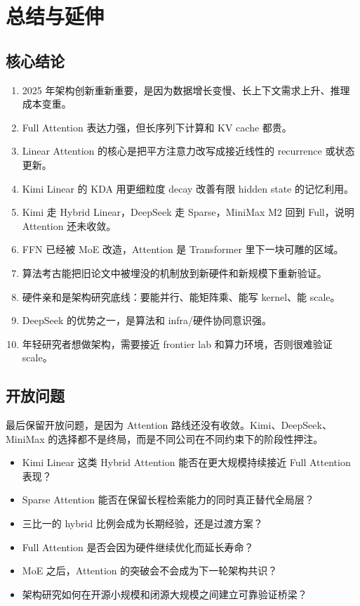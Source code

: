 \section{总结与延伸}

\subsection{核心结论}

\begin{enumerate}
\item 2025 年架构创新重新重要，是因为数据增长变慢、长上下文需求上升、推理成本变重。
\item Full Attention 表达力强，但长序列下计算和 KV cache 都贵。
\item Linear Attention 的核心是把平方注意力改写成接近线性的 recurrence 或状态更新。
\item Kimi Linear 的 KDA 用更细粒度 decay 改善有限 hidden state 的记忆利用。
\item Kimi 走 Hybrid Linear，DeepSeek 走 Sparse，MiniMax M2 回到 Full，说明 Attention 还未收敛。
\item FFN 已经被 MoE 改造，Attention 是 Transformer 里下一块可雕的区域。
\item 算法考古能把旧论文中被埋没的机制放到新硬件和新规模下重新验证。
\item 硬件亲和是架构研究底线：要能并行、能矩阵乘、能写 kernel、能 scale。
\item DeepSeek 的优势之一，是算法和 infra/硬件协同意识强。
\item 年轻研究者想做架构，需要接近 frontier lab 和算力环境，否则很难验证 scale。
\end{enumerate}

\subsection{开放问题}

最后保留开放问题，是因为 Attention 路线还没有收敛。Kimi、DeepSeek、MiniMax 的选择都不是终局，而是不同公司在不同约束下的阶段性押注。

\begin{itemize}
\item Kimi Linear 这类 Hybrid Attention 能否在更大规模持续接近 Full Attention 表现？
\item Sparse Attention 能否在保留长程检索能力的同时真正替代全局层？
\item 三比一的 hybrid 比例会成为长期经验，还是过渡方案？
\item Full Attention 是否会因为硬件继续优化而延长寿命？
\item MoE 之后，Attention 的突破会不会成为下一轮架构共识？
\item 架构研究如何在开源小规模和闭源大规模之间建立可靠验证桥梁？
\end{itemize}

